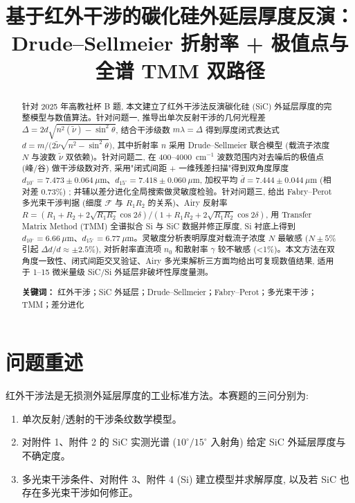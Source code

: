 \documentclass[UTF8,a4paper,12pt]{ctexart}
\title{基于红外干涉的碳化硅外延层厚度反演：\\ Drude--Sellmeier 折射率 + 极值点与全谱 TMM 双路径}
\author{}
\date{}
\begin{document}
\maketitle
\thispagestyle{plain}

\begin{abstract}
针对 2025 年高教社杯 B 题, 本文建立了红外干涉法反演碳化硅 (SiC) 外延层厚度的完整模型与数值算法。针对问题一, 推导出单次反射干涉的几何光程差 $\Delta = 2d\sqrt{n^2(\tilde{\nu})-\sin^2\theta}$, 结合干涉级数 $m\lambda=\Delta$ 得到厚度闭式表达式 $d = m\big/\!\big(2\tilde{\nu}\sqrt{n^2-\sin^2\theta}\big)$, 其中折射率 $n$ 采用 Drude--Sellmeier 联合模型 (载流子浓度 $N$ 与波数 $\tilde{\nu}$ 双依赖)。针对问题二, 在 400--4000~cm$^{-1}$ 波数范围内对去噪后的极值点 (峰/谷) 做干涉级数对齐, 采用"闭式间距 + 一维残差扫描"得到双角度厚度 $d_{10^\circ}=7.473\pm0.064~\mu$m、$d_{15^\circ}=7.418\pm0.060~\mu$m, 加权平均 $\bar d = 7.444\pm0.044~\mu$m (相对差 $0.73\%$) ; 并辅以差分进化全局搜索做灵敏度检验。针对问题三, 给出 Fabry--Perot 多光束干涉判据 (细度 $\mathcal F$ 与 $R_1R_2$ 的关系)、Airy 反射率 $R = (R_1+R_2 + 2\sqrt{R_1R_2}\cos 2\delta)/(1+R_1R_2+2\sqrt{R_1R_2}\cos 2\delta)$, 用 Transfer Matrix Method (TMM) 全谱拟合 Si 与 SiC 数据并修正厚度, Si 衬底上得到 $d_{10^\circ}=6.66~\mu$m、$d_{15^\circ}=6.77~\mu$m。灵敏度分析表明厚度对载流子浓度 $N$ 最敏感 ($N\pm5\%$ 引起 $\Delta d/d \approx \pm 2.5\%$), 对折射率直流项 $n_0$ 和散射率 $\gamma$ 较不敏感 (\textless 1\%)。本文方法在双角度一致性、闭式间距交叉验证、Airy 多光束解析三方面均给出可复现数值结果, 适用于 1--15 微米量级 SiC/Si 外延层非破坏性厚度量测。

\textbf{关键词：} 红外干涉；SiC 外延层；Drude--Sellmeier；Fabry--Perot；多光束干涉；TMM；差分进化
\end{abstract}
\newpage

\tableofcontents
\newpage

\section{问题重述}
红外干涉法是无损测外延层厚度的工业标准方法。本赛题的三问分别为:
\begin{enumerate}[label=(\arabic*)]
\item 单次反射/透射的干涉条纹数学模型。
\item 对附件 1、附件 2 的 SiC 实测光谱 ($10^\circ/15^\circ$ 入射角) 给定 SiC 外延层厚度与不确定度。
\item 多光束干涉条件、对附件 3、附件 4 (Si) 建立模型并求解厚度, 以及若 SiC 也存在多光束干涉如何修正。
\end{enumerate}
\end{document}
